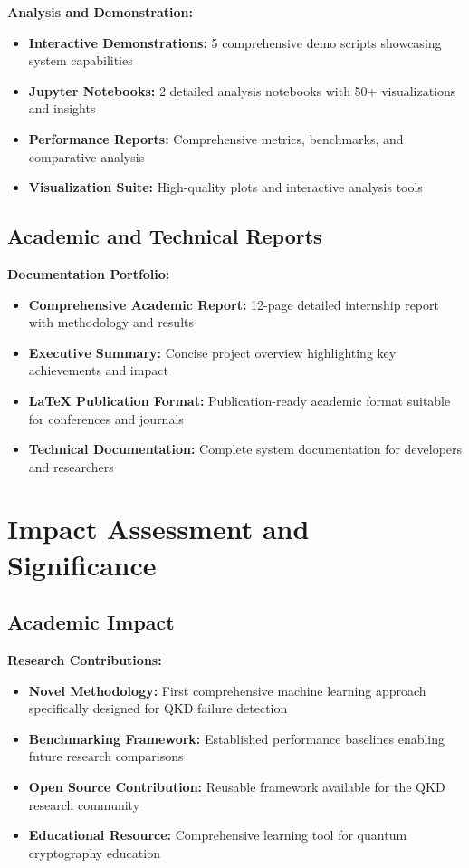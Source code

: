 \documentclass[12pt,a4paper]{article}
\begin{document}
\textbf{Analysis and Demonstration:}
\begin{itemize}
    \item \textbf{Interactive Demonstrations:} 5 comprehensive demo scripts showcasing system capabilities
    \item \textbf{Jupyter Notebooks:} 2 detailed analysis notebooks with 50+ visualizations and insights
    \item \textbf{Performance Reports:} Comprehensive metrics, benchmarks, and comparative analysis
    \item \textbf{Visualization Suite:} High-quality plots and interactive analysis tools
\end{itemize}

\subsection{Academic and Technical Reports}

\textbf{Documentation Portfolio:}
\begin{itemize}
    \item \textbf{Comprehensive Academic Report:} 12-page detailed internship report with methodology and results
    \item \textbf{Executive Summary:} Concise project overview highlighting key achievements and impact
    \item \textbf{LaTeX Publication Format:} Publication-ready academic format suitable for conferences and journals
    \item \textbf{Technical Documentation:} Complete system documentation for developers and researchers
\end{itemize}

\section{Impact Assessment and Significance}

\subsection{Academic Impact}

\textbf{Research Contributions:}
\begin{itemize}
    \item \textbf{Novel Methodology:} First comprehensive machine learning approach specifically designed for QKD failure detection
    \item \textbf{Benchmarking Framework:} Established performance baselines enabling future research comparisons
    \item \textbf{Open Source Contribution:} Reusable framework available for the QKD research community
    \item \textbf{Educational Resource:} Comprehensive learning tool for quantum cryptography education
\end{itemize}
\end{document}

